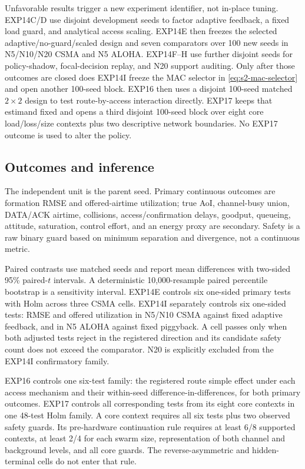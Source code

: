 Unfavorable results trigger a new experiment identifier, not in-place tuning.
EXP14C/D use disjoint development seeds to factor adaptive feedback, a fixed
load guard, and analytical access scaling. EXP14E then freezes the selected
adaptive/no-guard/scaled design and seven comparators over 100 new seeds in
N5/N10/N20 CSMA and N5 ALOHA. EXP14F--H use further disjoint seeds for
policy-shadow, focal-decision replay, and N20 support auditing. Only after
those outcomes are closed does EXP14I freeze the MAC selector in
\eqref{eq:s2-mac-selector} and open another 100-seed block. EXP16 then uses a
disjoint 100-seed matched $2\times2$ design to test route-by-access interaction
directly. EXP17 keeps that estimand fixed and opens a third disjoint 100-seed
block over eight core load/loss/size contexts plus two descriptive network
boundaries. No EXP17 outcome is used to alter the policy.

\subsection{Outcomes and inference}

The independent unit is the parent seed. Primary continuous outcomes are
formation RMSE and offered-airtime utilization; true AoI, channel-busy union,
DATA/ACK airtime, collisions, access/confirmation delays, goodput, queueing,
attitude, saturation, control effort, and an energy proxy are secondary.
Safety is a raw binary guard based on minimum separation and divergence, not a
continuous metric.

Paired contrasts use matched seeds and report mean differences with two-sided
95\% paired-$t$ intervals. A deterministic 10,000-resample paired percentile
bootstrap is a sensitivity interval. EXP14E controls six one-sided primary
tests with Holm across three CSMA cells. EXP14I separately controls six
one-sided tests: RMSE and offered utilization in N5/N10 CSMA against fixed
adaptive feedback, and in N5 ALOHA against fixed piggyback. A cell passes only
when both adjusted tests reject in the registered direction and its candidate
safety count does not exceed the comparator. N20 is explicitly excluded from
the EXP14I confirmatory family.

EXP16 controls one six-test family: the registered route simple effect under
each access mechanism and their within-seed difference-in-differences, for
both primary outcomes. EXP17 controls all corresponding tests from its eight
core contexts in one 48-test Holm family. A core context requires all six
tests plus two observed safety guards. Its pre-hardware continuation rule
requires at least 6/8 supported contexts, at least 2/4 for each swarm size,
representation of both channel and background levels, and all core guards.
The reverse-asymmetric and hidden-terminal cells do not enter that rule.

